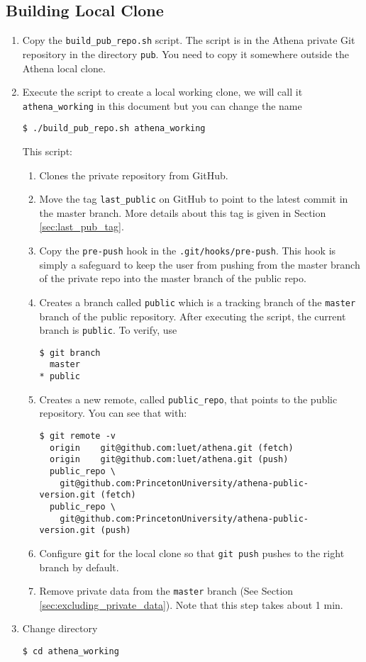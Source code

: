\documentclass[11pt]{article}
\begin{document}
\subsection{Building Local Clone}
\label{sec:building_local_clone}
\begin{enumerate}
\item Copy the \texttt{build\_pub\_repo.sh} script. The script is in
the Athena private Git repository in the directory \texttt{pub}. You
need to copy it somewhere outside the Athena local clone.
\item Execute the script to create a local working clone, we will call
it \texttt{athena\_working} in this document but you can change the
name
\begin{verbatim}
$ ./build_pub_repo.sh athena_working
\end{verbatim}
This script:
\begin{enumerate}
\item Clones the private repository from GitHub.
\item Move the tag \texttt{last\_public} on GitHub to point to the
latest commit in the master branch. More details about this tag is
given in Section \ref{sec:last_pub_tag}.
\item Copy the \texttt{pre-push} hook in the
\texttt{.git/hooks/pre-push}. This hook is simply a safeguard to keep
the user from pushing from the master branch of the private repo into
the master branch of the public repo.
\item Creates a branch called \texttt{public} which is a tracking
branch of the \texttt{master} branch of the public repository. After
executing the script, the current branch is \texttt{public}. To
verify, use
\begin{verbatim}
$ git branch
  master
* public
\end{verbatim}
\item Creates a new remote, called \texttt{public\_repo}, that points
to the public repository.  You can see that with:
\begin{verbatim}
$ git remote -v
  origin	git@github.com:luet/athena.git (fetch)
  origin	git@github.com:luet/athena.git (push)
  public_repo \
    git@github.com:PrincetonUniversity/athena-public-version.git (fetch)
  public_repo \
    git@github.com:PrincetonUniversity/athena-public-version.git (push)
\end{verbatim}
\item Configure \texttt{git} for the local clone so that \texttt{git
push} pushes to the right branch by default.
\item Remove private data from the \texttt{master} branch (See Section
\ref{sec:excluding_private_data}).  Note that this step takes about 1
min.
\end{enumerate}
\item Change directory
\begin{verbatim}
$ cd athena_working
\end{verbatim}
\end{enumerate}
\end{document}
